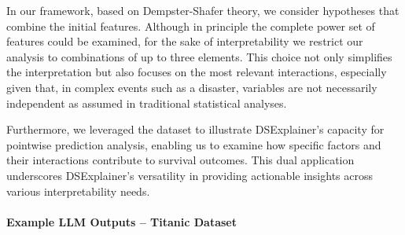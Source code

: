 \documentclass[acmlarge]{acmart}
\begin{document}
In our framework, based on Dempster-Shafer theory, we consider hypotheses that combine the initial features. Although in principle the complete power set of features could be examined, for the sake of interpretability we restrict our analysis to combinations of up to three elements. This choice not only simplifies the interpretation but also focuses on the most relevant interactions, especially given that, in complex events such as a disaster, variables are not necessarily independent as assumed in traditional statistical analyses.

Furthermore, we leveraged the dataset to illustrate DSExplainer's capacity for pointwise prediction analysis, enabling us to examine how specific factors and their interactions contribute to survival outcomes. This dual application underscores DSExplainer's versatility in providing actionable insights across various interpretability needs.



\paragraph{Example LLM Outputs – Titanic Dataset}
\end{document}
